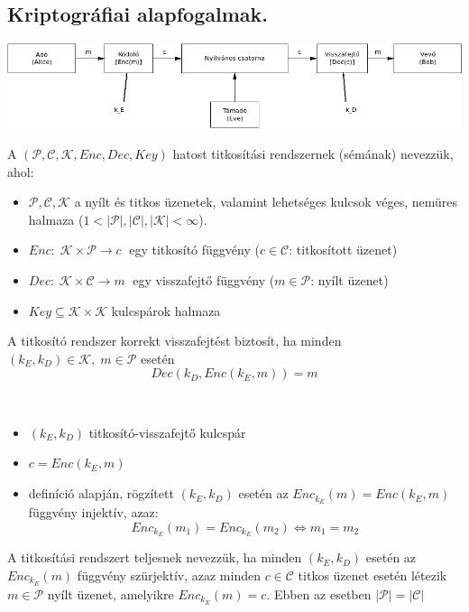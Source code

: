 \subsection{Kriptográfiai alapfogalmak.}
\begin{center}
	\includegraphics[width=0.7\linewidth]{fig/14-Crypto_scheme}
\end{center}
\begin{definition}
	A $(\mathcal{P}, \mathcal{C}, \mathcal{K},Enc,Dec,Key)$ hatost titkosítási rendszernek (sémának) nevezzük, ahol:
	\begin{itemize}[nosep]
		\item $\mathcal{P}, \mathcal{C}, \mathcal{K}$ a nyílt és titkos üzenetek, valamint lehetséges kulcsok véges, nemüres halmaza ($1<|\mathcal{P}|,|\mathcal{C}|,|\mathcal{K}| < \infty$).
		\item $Enc:\; \mathcal{K}\times\mathcal{P} \to c\;$ egy titkosító függvény ($c \in \mathcal{C}$: titkosított üzenet)
		\item $Dec:\; \mathcal{K}\times\mathcal{C} \to m\;$ egy visszafejtő függvény ($m \in \mathcal{P}$: nyílt üzenet)
		\item $Key \subseteq \mathcal{K}\times\mathcal{K}$ kulcspárok halmaza
	\end{itemize}
\end{definition}
\begin{definition}
	A titkosító rendszer korrekt visszafejtést biztosít, ha minden $(k_E,k_D)\in\mathcal{K},\; m\in\mathcal{P}$ esetén
	$$Dec(k_D,Enc(k_E,m)) = m$$
\end{definition}
\begin{note}~\\
	\begin{itemize}[nosep]
		\item $(k_E,k_D)$ titkosító-visszafejtő kulcspár
		\item $c = Enc(k_E,m)$
		\item definíció alapján, rögzített $(k_E,k_D)$ esetén az $Enc_{k_E}(m) = Enc(k_E,m)$ függvény injektív, azaz:
		$$Enc_{k_E}(m_1) = Enc_{k_E}(m_2) \Leftrightarrow m_1 = m_2$$
	\end{itemize}
\end{note}
\begin{definition}
	A titkosítási rendszert teljesnek nevezzük, ha minden $(k_E,k_D)$ esetén az $Enc_{k_E}(m)$ függvény szürjektív, azaz minden $c\in\mathcal{C}$ titkos üzenet esetén létezik $m\in\mathcal{P}$ nyílt üzenet, amelyikre $Enc_{k_E}(m) = c$. Ebben az esetben $|\mathcal{P}| = |\mathcal{C}|$
\end{definition}
